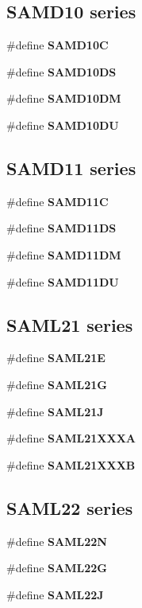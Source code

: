 \subsection*{S\+A\+M\+D10 series}
\begin{DoxyCompactItemize}
\item 
\#define {\bfseries S\+A\+M\+D10\+C}
\item 
\#define {\bfseries S\+A\+M\+D10\+D\+S}
\item 
\#define {\bfseries S\+A\+M\+D10\+D\+M}
\item 
\#define {\bfseries S\+A\+M\+D10\+D\+U}
\end{DoxyCompactItemize}
\subsection*{S\+A\+M\+D11 series}
\begin{DoxyCompactItemize}
\item 
\#define {\bfseries S\+A\+M\+D11\+C}
\item 
\#define {\bfseries S\+A\+M\+D11\+D\+S}
\item 
\#define {\bfseries S\+A\+M\+D11\+D\+M}
\item 
\#define {\bfseries S\+A\+M\+D11\+D\+U}
\end{DoxyCompactItemize}
\subsection*{S\+A\+M\+L21 series}
\begin{DoxyCompactItemize}
\item 
\#define {\bfseries S\+A\+M\+L21\+E}
\item 
\#define {\bfseries S\+A\+M\+L21\+G}
\item 
\#define {\bfseries S\+A\+M\+L21\+J}
\item 
\#define {\bfseries S\+A\+M\+L21\+X\+X\+X\+A}
\item 
\#define {\bfseries S\+A\+M\+L21\+X\+X\+X\+B}
\end{DoxyCompactItemize}
\subsection*{S\+A\+M\+L22 series}
\begin{DoxyCompactItemize}
\item 
\#define {\bfseries S\+A\+M\+L22\+N}
\item 
\#define {\bfseries S\+A\+M\+L22\+G}
\item 
\#define {\bfseries S\+A\+M\+L22\+J}
\end{DoxyCompactItemize}
